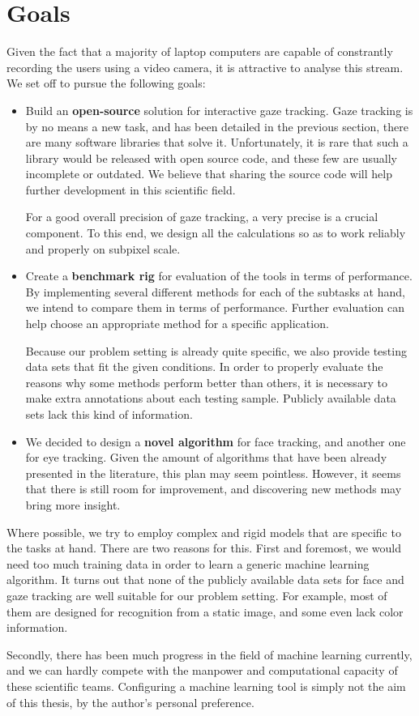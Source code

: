 \chapter{Goals}

Given the fact that a majority of laptop computers are capable of constrantly recording the users using a video camera, it is attractive to analyse this stream.
We set off to pursue the following goals:
\begin{itemize}

\item Build an \textbf{open-source} solution for interactive gaze tracking.
Gaze tracking is by no means a new task, and has been detailed in the previous section, there are many software libraries that solve it.
Unfortunately, it is rare that such a library would be released with open source code, and these few are usually incomplete or outdated.
We believe that sharing the source code will help further development in this scientific field.

For a good overall precision of gaze tracking, a very precise is a crucial component.
To this end, we design all the calculations so as to work reliably and properly on subpixel scale.

\item Create a \textbf{benchmark rig} for evaluation of the tools in terms of performance.
By implementing several different methods for each of the subtasks at hand, we intend to compare them in terms of performance.
Further evaluation can help choose an appropriate method for a specific application.

Because our problem setting is already quite specific, we also provide testing data sets that fit the given conditions.
In order to properly evaluate the reasons why some methods perform better than others, it is necessary to make extra annotations about each testing sample.
Publicly available data sets lack this kind of information.

\item We decided to design a \textbf{novel algorithm} for face tracking, and another one for eye tracking.
Given the amount of algorithms that have been already presented in the literature, this plan may seem pointless.
However, it seems that there is still room for improvement, and discovering new methods may bring more insight.

\end{itemize}

Where possible, we try to employ complex and rigid models that are specific to the tasks at hand.
There are two reasons for this.
First and foremost, we would need too much training data in order to learn a generic machine learning algorithm.
It turns out that none of the publicly available data sets for face and gaze tracking are well suitable for our problem setting.
For example, most of them are designed for recognition from a static image, and some even lack color information.

Secondly, there has been much progress in the field of machine learning currently, and we can hardly compete with the manpower and computational capacity of these scientific teams.
Configuring a machine learning tool is simply not the aim of this thesis, by the author's personal preference.
